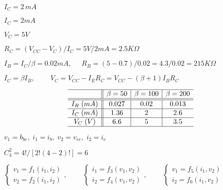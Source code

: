 \documentclass{article}
\def\lthtmlcheckvsize{\ifdim\ht\sizebox<\vsize 
  \ifdim\wd\sizebox<\hsize\expandafter\hfill\fi \expandafter\vfill
  \else\expandafter\vss\fi}%
\begin{document}
{\newpage\clearpage
{}%
$ I_C=2\,mA$%
\lthtmlindisplaymathZ
\lthtmlcheckvsize\clearpage}

{\newpage\clearpage
{}%
$ I_C=2mA$%
\lthtmlindisplaymathZ
\lthtmlcheckvsize\clearpage}

{\newpage\clearpage
{}%
$ V_C=5V$%
\lthtmlindisplaymathZ
\lthtmlcheckvsize\clearpage}

{\newpage\clearpage
{}%
$\displaystyle R_C=(V_{CC}-V_C)/I_C=5V/2mA=2.5K\Omega$%
\lthtmlindisplaymathZ
\lthtmlcheckvsize\clearpage}

{\newpage\clearpage
{}%
$\displaystyle I_B=I_C/\beta=0.02mA, \;\;\;\;\;R_B=(5-0.7)/0.02=4.3/0.02=215K\Omega$%
\lthtmlindisplaymathZ
\lthtmlcheckvsize\clearpage}

{\newpage\clearpage
{}%
$\displaystyle I_C=\beta I_B,\;\;\;\;\;\;\;\;V_C=V_{CC}-I_ER_C=V_{CC}-(\beta+1)I_BR_C$%
\lthtmlindisplaymathZ
\lthtmlcheckvsize\clearpage}

{\newpage\clearpage
{}%
\begin{displaymath}\begin{array}{c||c|c|c}\hline
& \beta=50  & \beta=100 & \beta=200  \\\hline\hline
I_B\;(mA)  & 0.027 & 0.02     & 0.013 \\\hline
I_C\;(mA)   & 1.36 & 2     & 2.6      \\\hline
V_C\;(V)   & 6.6 & 5     & 3.5        \\\hline
\end{array}\end{displaymath}%
\lthtmldisplayZ
\lthtmlcheckvsize\clearpage}

{\newpage\clearpage
{}%
$ v_1=b_{be},\;i_1=i_b,\;v_2=v_{ce},\;i_2=i_c$%
\lthtmlindisplaymathZ
\lthtmlcheckvsize\clearpage}

{\newpage\clearpage
{}%
$ C_4^2=4!/[2!(4-2)!]=6$%
\lthtmlindisplaymathZ
\lthtmlcheckvsize\clearpage}

{\newpage\clearpage
{}%
$\displaystyle \left\{ \begin{array}{l} v_1=f_1(i_1,i_2) \\v_2=f_2(i_1,i_2)
\end{array} \right.,
\;\;\;\;\;\;\;\;
\left\{ \begin{array}{l} i_1=f_3(v_1,v_2) \\i_2=f_4(v_1,v_2)
\end{array} \right.,
\;\;\;\;\;\;\;\;
\left\{ \begin{array}{l} v_1=f_5(i_1,v_2) \\i_2=f_6(i_1,v_2)
\end{array} \right.$%
\lthtmlindisplaymathZ
\lthtmlcheckvsize\clearpage}
\end{document}
